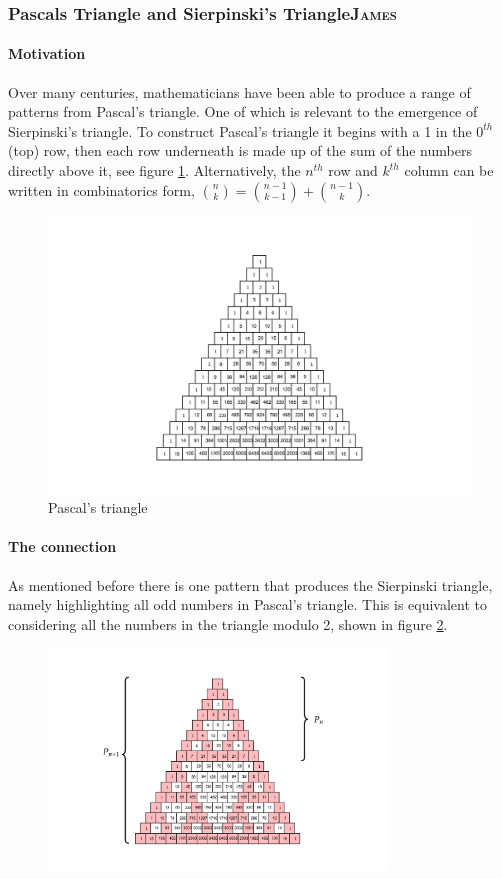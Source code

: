 \documentclass[a4paper,11pt,twoside]{article}
\begin{document}
\subsubsection{Pascals Triangle and Sierpinski's Triangle\hfill{}\textsc{James}}
\label{pascal-sierpinski}
\paragraph{Motivation}
\label{sec:org4f67b1b}
Over many centuries, mathematicians have been able to produce a range of patterns from Pascal's triangle. One of which is relevant to the emergence of Sierpinski's triangle. To construct Pascal's triangle it begins with a 1 in the \(0^{th}\) (top) row, then each row underneath is made up of the sum of the numbers directly above it, see figure \ref{fig:pascal-triangle}. Alternatively, the \(n^{th}\) row and \(k^{th}\) column can be written in combinatorics form, \(\binom{n}{k} = \binom{n-1}{k-1} + \binom{n-1}{k}\).

\begin{figure}[htbp]
\centering
\includegraphics[width=.9\linewidth]{media/tikz/pascals-triangle.png}
\caption{\label{fig:pascal-triangle}Pascal's triangle}
\end{figure}
\paragraph{The connection}
\label{sec:org218c905}
As mentioned before there is one pattern that produces the Sierpinski triangle, namely highlighting all odd numbers in Pascal's triangle. This is equivalent to considering all the numbers in the triangle modulo 2, shown in figure \ref{fig:pascal-sierpinski-tri}.

\begin{figure}[htbp]
\centering
\includegraphics[width=9cm]{media/tikz/pascal-sierpinski-tri.png}
\label{fig:pascal-sierpinski-tri}
\end{figure}
\end{document}
